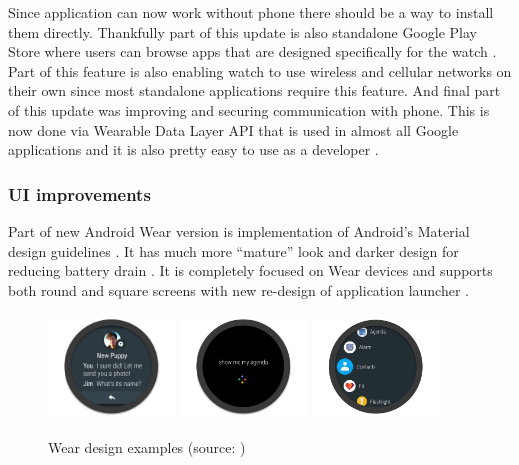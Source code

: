 Since application can now work without phone there should be a way to install them directly. Thankfully part of this update is also standalone Google Play Store where users can browse apps that are designed specifically for the watch \cite{AW2WN}. Part of this feature is also enabling watch to use wireless and cellular networks on their own since most standalone applications require this feature. And final part of this update was improving and securing communication with phone. This is now done via Wearable Data Layer API that is used in almost all Google applications and it is also pretty easy to use as a developer \cite{AW2UG}. 

\subsubsection{UI improvements}\label{sec:UIImprovements}
Part of new Android Wear version is implementation of Android's Material design guidelines \cite{DoAW}. It has much more \enquote{mature} look and darker design for reducing battery drain \cite{AW2WN}. It is completely focused on Wear devices and supports both round and square screens with new re-design of application launcher \cite{AW2UG}.

\begin{figure}[H]
	\begin{centering}
		\includegraphics[width=0.3\textwidth]{img/wear_design_notification}
		\includegraphics[width=0.3\textwidth]{img/wear_design_agenda}
		\includegraphics[width=0.3\textwidth]{img/wear_design_menu}
		\par\end{centering}
	\caption{Wear design examples (source: \cite{DoAW})\label{fig:WearDesignExamples}}
	\label{fig03c04}
\end{figure}

